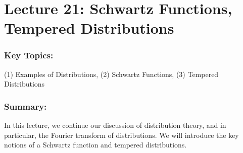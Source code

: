 \documentclass{article}
\begin{document}
\newpage 
	
	
\section{Lecture 21: Schwartz Functions, Tempered Distributions}
\subsubsection{Key Topics:} (1) Examples of Distributions, (2) Schwartz Functions, (3) Tempered Distributions 

\subsubsection{Summary:} In this lecture, we continue our discussion of distribution theory, and in particular, the Fourier transform of distributions. We will introduce the key notions of a Schwartz function and tempered distributions. 
\end{document}
